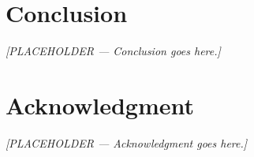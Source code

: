 \documentclass[conference]{IEEEtran}
\begin{document}
\section{Conclusion}
\label{sec:conclusion}
\textit{[PLACEHOLDER --- Conclusion goes here.]}

\section*{Acknowledgment}
\textit{[PLACEHOLDER --- Acknowledgment goes here.]}
\end{document}
